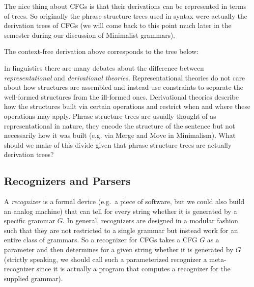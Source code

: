The nice thing about CFGs is that their derivations can be represented in terms of trees.
So originally the phrase structure trees used in syntax were actually the derivation trees of CFGs (we will come back to this point much later in the semester during our discussion of Minimalist grammars).
%
\begin{examplebox}
    The context-free derivation above corresponds to the tree below:
    \begin{center}
    \end{center}
\end{examplebox}
%
\begin{exercise}
    In linguistics there are many debates about the difference between \emph{representational} and \emph{derivational theories}.
    Representational theories do not care about how structures are assembled and instead use constraints to separate the well-formed structures from the ill-formed ones.
    Derivational theories describe how the structures built via certain operations and restrict when and where these operations may apply.
    Phrase structure trees are usually thought of as representational in nature, they encode the structure of the sentence but not necessarily how it was built (e.g. via Merge and Move in Minimalism).
    What should we make of this divide given that phrase structure trees are actually derivation trees?
\end{exercise}


\subsection{Recognizers and Parsers}
\label{sub:BigPicture_Parsing}
A \emph{recognizer} is a formal device (e.g.\ a piece of software, but we could also build an analog machine) that can tell for every string whether it is generated by a specific grammar $G$.
In general, recognizers are designed in a modular fashion such that they are not restricted to a single grammar but instead work for an entire class of grammars.
So a recognizer for CFGs takes a CFG $G$ as a parameter and then determines for a given string whether it is generated by $G$ (strictly speaking, we should call such a parameterized recognizer a meta-recognizer since it is actually a program that computes a recognizer for the supplied grammar).

